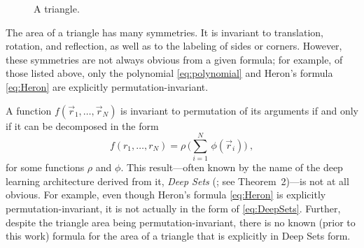 \documentclass[10pt]{article}
\begin{document}
\begin{figure}[t!]
    \caption{A triangle.}
    \label{fig:triangle}
\end{figure}

The area of a triangle has many symmetries. It is invariant to translation, rotation, and reflection, as well as to the labeling of sides or corners. However, these symmetries are not always obvious from a given formula; for example, of those listed above, only the polynomial \eqref{eq:polynomial} and Heron's formula \eqref{eq:Heron} are explicitly permutation-invariant.

A function $f(\vec{r}_1, \dots, \vec{r}_N)$ is invariant to permutation of its arguments if and only if it can be decomposed in the form
\begin{equation}
    f(r_1, \dots, r_N) = \rho \, \big( \sum_{i=1}^{N} \, \phi(\vec{r}_i) \big)~,\label{eq:DeepSets}
\end{equation}
for some functions $\rho$ and $\phi$. This result---often known by the name of the deep learning architecture derived from it, \emph{Deep Sets} (\citealt{Zaheer+17deepsets}; see Theorem~2)---is not at all obvious.
For example, even though Heron's formula \eqref{eq:Heron} is explicitly permutation-invariant, it is not actually in the form of \eqref{eq:DeepSets}. 
Further, despite the triangle area being permutation-invariant, there is no known (prior to this work) formula for the area of a triangle that is explicitly in Deep Sets form.
\end{document}
